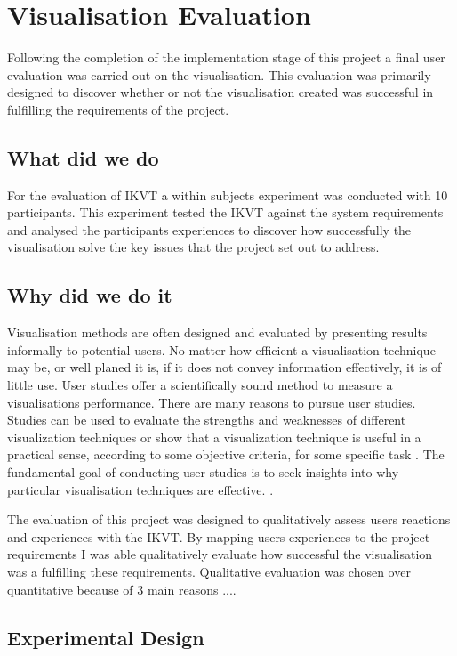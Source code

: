 \chapter{Visualisation Evaluation}\label{C:eval}
Following the completion of the implementation stage of this project a final
user evaluation was carried out on the visualisation. This evaluation was
primarily designed to discover whether or not the visualisation created was
successful in fulfilling the requirements of the project.

\section{What did we do}
For the evaluation of IKVT a within subjects experiment was conducted with 10
participants. This experiment tested the IKVT against the system requirements
and analysed the participants experiences to discover how successfully the
visualisation solve the key issues that the project set out to address. 


\section{Why did we do it}
Visualisation methods are often designed and evaluated by presenting 
results informally to potential users. No matter how 
efficient a visualisation technique may be, or well planed it is, if it does
not convey information 
effectively, it is of little use. User studies offer a 
scientifically sound method to measure a visualisations 
performance. There are many reasons to pursue user studies. Studies can 
be used to evaluate the strengths and weaknesses of 
different visualization techniques or show that a visualization technique is 
useful in a practical sense, according to some objective 
criteria, for some specific task \cite{kosara2003thoughts}. 
The fundamental goal of conducting user studies is to 
seek insights into why particular visualisation techniques are effective.
\cite{kosara2003thoughts}.

The evaluation of this project was designed to qualitatively assess users
reactions and experiences with the IKVT. By mapping users experiences to the
project requirements I was able qualitatively evaluate how successful the
visualisation
was a fulfilling these requirements. Qualitative evaluation was chosen over
quantitative because of 3 main reasons ....~

\section{Experimental Design}
